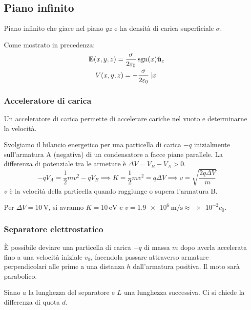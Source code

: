\subsection{Piano infinito}

Piano infinito che giace nel piano $yz$ e ha densità di carica superficiale $\sigma$.

Come mostrato in precedenza:
\begin{gather}
    \mathbf{E}(x, y, z) = \frac{\sigma}{2\varepsilon_0} \operatorname{sgn}(x) \hat{\mathbf{u}}_{x} \\
    V(x, y, z) = -\frac{\sigma}{2\varepsilon_0} \left\lvert x \right\rvert
\end{gather}

\subsubsection{Acceleratore di carica}
\label{sec:acceleratore_carica}

Un acceleratore di carica permette di accelerare cariche nel vuoto e determinarne la velocità.

Svolgiamo il bilancio energetico per una particella di carica $-q$ inizialmente sull'armatura A (negativa) di un condensatore a facce piane parallele.
La differenza di potenziale tra le armeture è $\Delta V = V_B - V_A > 0$.
\begin{equation}
    -q V_A = \frac{1}{2} m v^2 - q V_B
    \implies K = \frac{1}{2} m v^2 = q \Delta V
    \implies v = \sqrt{\frac{2 q \Delta V}{m}}
\end{equation}
$v$ è la velocità della particella quando raggiunge o supera l'armatura B.

Per $\Delta V = \qty{10}{\volt}$, si avranno $K = \qty{10}{\electronvolt}$ e $v = \qty{1.9e6}{\metre\per\second} \approx \num{e-2} c_0$.

\subsubsection{Separatore elettrostatico}


È possibile deviare una particella di carica $-q$ di massa $m$ dopo averla accelerata fino a una velocità iniziale $v_0$, facendola passare attraverso armature perpendicolari alle prime a una distanza $h$ dall'armatura positiva.
Il moto sarà parabolico.

Siano $a$ la lunghezza del separatore e $L$ una lunghezza successiva.
Ci si chiede la differenza di quota $d$.

